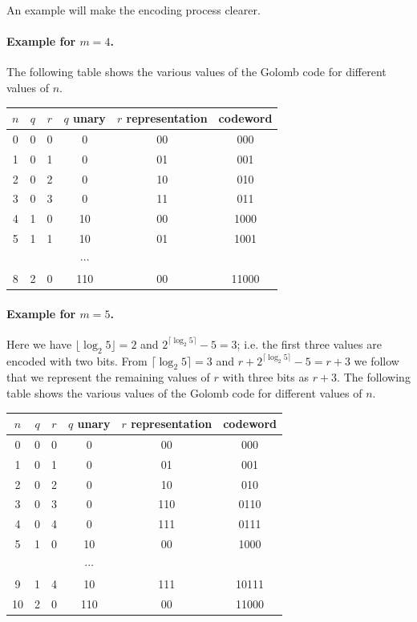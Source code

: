 An example will make the encoding process clearer.

\paragraph{Example for $m=4$.} The following table shows the various values of the Golomb code for different values of $n$.

\vspace*{3mm}

\begin{tabular}{c|cc|cc|c}
  $n$ & $q$ & $r$ & $q$ unary & $r$ representation & codeword \\ \hline
  0 & 0 & 0 & 0 & 00 & 000 \\
  1 & 0 & 1 & 0 & 01 & 001 \\
  2 & 0 & 2 & 0 & 10 & 010 \\
  3 & 0 & 3 & 0 & 11 & 011 \\
  4 & 1 & 0 & 10 & 00 & 1000 \\
  5 & 1 & 1 & 10 & 01 & 1001 \\
      & & & $\cdots$ & & \\
  8 & 2 & 0 & 110 & 00 & 11000
\end {tabular}
  
\vspace*{3mm}

\paragraph{Example for $m=5$.} Here we have $\lfloor \log_2 5 \rfloor = 2$ and $2^{\lceil \log_2 5 \rceil}  - 5 = 3$; i.e. the first three values are encoded with two bits. From $\lceil \log_2 5 \rceil = 3$ and $r + 2^{\lceil \log_2 5 \rceil} - 5 = r+3$ we follow that we represent the remaining values of $r$ with three bits as $r+3$. The following table shows the various values of the Golomb code for different values of $n$.

\vspace*{3mm}

\begin{tabular}{c|cc|cc|c}
  $n$ & $q$ & $r$ & $q$ unary & $r$ representation & codeword \\ \hline
  0 & 0 & 0 & 0 & 00 & 000 \\
  1 & 0 & 1 & 0 & 01 & 001 \\
  2 & 0 & 2 & 0 & 10 & 010 \\
  3 & 0 & 3 & 0 & 110 & 0110 \\
  4 & 0 & 4 & 0 & 111 & 0111 \\
  5 & 1 & 0 & 10 & 00 & 1000 \\
        & & & $\cdots$ & & \\
  9 & 1 & 4 & 10 & 111 & 10111 \\
  10 & 2 & 0 & 110 & 00 & 11000
\end {tabular}
  
